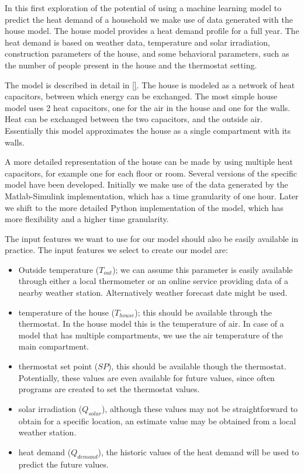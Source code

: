 In this first exploration of the potential of using a machine learning model to predict the heat demand of a household we make use of data generated with the house model. The house model provides a heat demand profile for a full year. The heat demand is based on weather data, temperature and solar irradiation, construction parameters of the house, and some behavioral parameters, such as the number of people present in the house and the thermostat setting.   

The model is described in detail in \ref{}. The house is modeled as a network of heat capacitors, between which energy can be exchanged. The most simple house model uses 2 heat capacitors, one for the air in the house and one for the walls. Heat can be exchanged between the two capacitors, and the outside air. Essentially this model approximates the house as a single compartment with its walls. 

A more detailed representation of the house can be made by using multiple heat capacitors, for example one for each floor or room.   
Several versions of the specific model have been developed. Initially we make use of the data generated by the Matlab-Simulink implementation, which has a time granularity of one hour. Later we shift to the more detailed Python implementation of the model, which has more flexibility and a higher time granularity.

The input features we want to use for our model should also be easily available in practice. The input features we select to create our model are:
\begin{itemize}
\item Outside temperature ($T_{out}$); we can assume this parameter is easily available through either a local thermometer or an online service providing data of a nearby weather station. Alternatively weather forecast date might be used. 
\item temperature of the house ($T_{house}$); this should be available through the thermostat. In the house model this is the temperature of air. In case of a model that has multiple compartments, we use the air temperature of the main compartment.
\item thermostat set point ($SP$), this should be available though the thermostat. Potentially, these values are even available for future values, since often programs are created to set the thermostat values. 
\item solar irradiation ($Q_{solar}$), although these values may not be straightforward to obtain for a specific location, an estimate value may be obtained from a local weather station. 
\item heat demand ($Q_{demand}$), the historic values of the heat demand will be used to predict the future values. 
\end{itemize}

